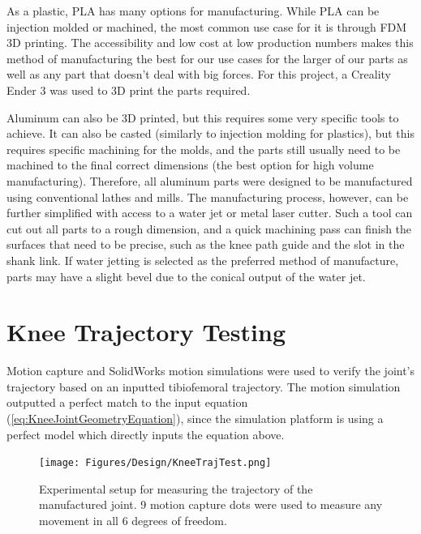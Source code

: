 As a plastic, PLA has many options for manufacturing. While PLA can be injection molded or machined, the most common use case for it is through FDM 3D printing. The accessibility and low cost at low production numbers makes this method of manufacturing the best for our use cases for the larger of our parts as well as any part that doesn't deal with big forces. For this project, a Creality Ender 3 was used to 3D print the parts required. 

Aluminum can also be 3D printed, but this requires some very specific tools to achieve. It can also be casted (similarly to injection molding for plastics), but this requires specific machining for the molds, and the parts still usually need to be machined to the final correct dimensions (the best option for high volume manufacturing). Therefore, all aluminum parts were designed to be manufactured using conventional lathes and mills. The manufacturing process, however, can be further simplified with access to a water jet or metal laser cutter. Such a tool can cut out all parts to a rough dimension, and a quick machining pass can finish the surfaces that need to be precise, such as the knee path guide and the slot in the shank link. If water jetting is selected as the preferred method of manufacture, parts may have a slight bevel due to the conical output of the water jet.

\section{Knee Trajectory Testing}
Motion capture and SolidWorks motion simulations were used to verify the joint's trajectory based on an inputted tibiofemoral trajectory. The motion simulation outputted a perfect match to the input equation (\autoref{eq:KneeJointGeometryEquation}), since the simulation platform is using a perfect model which directly inputs the equation above.

\begin{figure}[ht!]
    \centering
    \texttt{[image: Figures/Design/KneeTrajTest.png]}
    \caption{Experimental setup for measuring the trajectory of the manufactured joint. 9 motion capture dots were used to measure any movement in all 6 degrees of freedom.}
    \label{fig:TrajTestSetup}
\end{figure}

